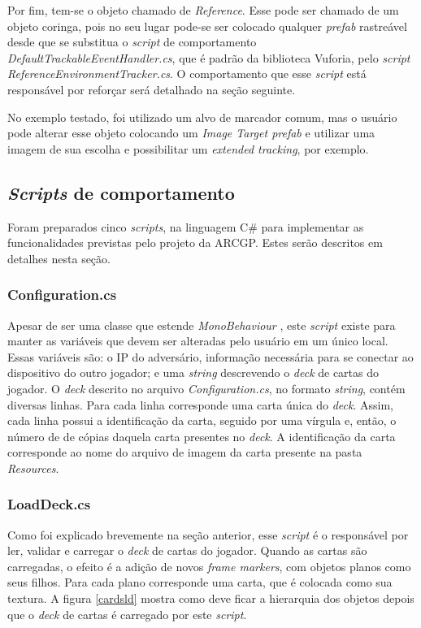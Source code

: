 \documentclass[conference]{IEEEtran}
\begin{document}
Por fim, tem-se o objeto chamado de \textit{Reference}. Esse pode ser chamado de 
um objeto coringa, pois no seu lugar pode-se ser colocado qualquer \textit{
prefab} rastreável desde que se substitua o \textit{script} de comportamento 
\textit{DefaultTrackableEventHandler.cs}, que é padrão da biblioteca Vuforia, 
pelo \textit{script ReferenceEnvironmentTracker.cs}. O comportamento que esse 
\textit{script} está responsável por reforçar será detalhado na seção seguinte.

No exemplo testado, foi utilizado um alvo de marcador comum, mas o usuário pode 
alterar esse objeto colocando um \textit{Image Target prefab} e utilizar uma 
imagem de sua escolha e possibilitar um \textit{extended tracking}, por exemplo.

\subsection{\textit{Scripts} de comportamento}
\label{scripts}
Foram preparados cinco \textit{scripts}, na linguagem C\# para implementar as 
funcionalidades previstas pelo projeto da ARCGP. Estes serão descritos em 
detalhes nesta seção.

\subsubsection{Configuration.cs}
\label{config}
Apesar de ser uma classe que estende \textit{MonoBehaviour} \cite{mono}, este 
\textit{script} existe para manter as variáveis que devem ser alteradas pelo 
usuário em um único local. Essas variáveis são: o IP do adversário, informação 
necessária para se conectar ao dispositivo do outro jogador; e uma 
\textit{string} descrevendo o \textit{deck} de cartas do jogador. O 
\textit{deck} descrito no arquivo \textit{Configuration.cs}, no formato 
\textit{string}, contém diversas linhas. Para cada linha corresponde uma carta 
única do \textit{deck}. Assim, cada linha possui a identificação da carta, 
seguido por uma vírgula e, então, o número de de cópias daquela carta presentes 
no \textit{deck}. A identificação da carta corresponde ao nome do arquivo de 
imagem da carta presente na pasta \textit{Resources}.

\subsubsection{LoadDeck.cs}
\label{loadeck}
Como foi explicado brevemente na seção anterior, esse \textit{script} é o 
responsável por ler, validar e carregar o \textit{deck} de cartas do jogador.
Quando as cartas são carregadas, o efeito é a adição de novos 
\textit{frame markers}, com objetos planos como seus filhos. Para cada plano 
corresponde uma carta, que é colocada como sua textura. A figura \ref{cardsld} 
mostra como deve ficar a hierarquia dos objetos depois que o \textit{deck} de 
cartas é carregado por este \textit{script}.
\end{document}
